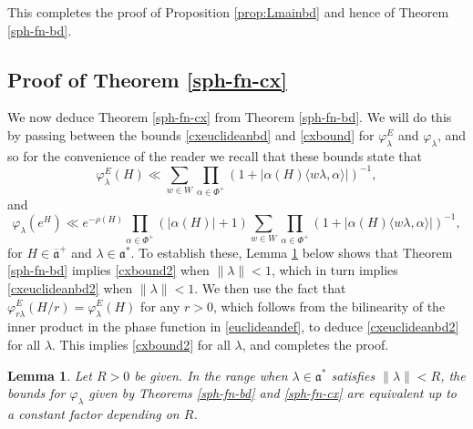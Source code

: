 \documentclass[12pt]{amsart}
\newtheorem{lemma}[theorem]{Lemma}
\theoremstyle{remark}
\newcommand{\ga}{\mathfrak a}
\newcommand{\be}{\begin{equation}}
\newcommand{\ee}{\end{equation}}
\begin{document}
This completes the proof of Proposition \ref{prop:Lmainbd} and hence of Theorem \ref{sph-fn-bd}.

\subsection{Proof of Theorem \ref{sph-fn-cx}}
\label{sec:cx-pf}

We now deduce Theorem \ref{sph-fn-cx} from Theorem \ref{sph-fn-bd}.  We will do this by passing between the bounds \eqref{cxeuclideanbd} and \eqref{cxbound} for $\varphi_\lambda^E$ and $\varphi_\lambda$, and so for the convenience of the reader we recall that these bounds state that
\be
\label{cxeuclideanbd2}
\varphi_\lambda^E(H) \ll \sum_{w \in W} \prod_{\alpha \in \Phi^+} (1 + |\alpha(H) \langle w\lambda, \alpha \rangle|)^{-1},
\ee
and
\be
\label{cxbound2}
\varphi_\lambda(e^H) \ll e^{-\rho(H)} \prod_{\alpha \in \Phi^+} (|\alpha(H)|+1) \sum_{w \in W} \prod_{\alpha \in \Phi^+} (1 + |\alpha(H) \langle w\lambda, \alpha \rangle|)^{-1},
\ee
for $H \in \overline{\ga}^+$ and $\lambda \in \ga^*$.  To establish these, Lemma \ref{sph-bd-equiv} below shows that Theorem \ref{sph-fn-bd} implies \eqref{cxbound2} when $\| \lambda \| < 1$, which in turn implies \eqref{cxeuclideanbd2} when $\| \lambda \| < 1$.  We then use the fact that $\varphi_{r\lambda}^E(H/r) = \varphi_\lambda^E(H)$ for any $r > 0$, which follows from the bilinearity of the inner product in the phase function in \eqref{euclideandef}, to deduce \eqref{cxeuclideanbd2} for all $\lambda$. This implies \eqref{cxbound2} for all $\lambda$, and completes the proof.

\begin{lemma}
\label{sph-bd-equiv}
Let $R > 0$ be given.  In the range when $\lambda \in \ga^*$ satisfies $\| \lambda \| < R$, the bounds for $\varphi_\lambda$ given by Theorems \ref{sph-fn-bd} and \ref{sph-fn-cx} are equivalent up to a constant factor depending on $R$.
\end{lemma}
\end{document}
